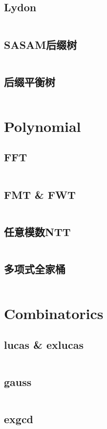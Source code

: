 \documentclass[titlepage, a4paper]{article}
\begin{document}
\begin{multicols}{2}
\begin{spacing}{0.6}
				\subsection{Lydon}
					\inputminted{cpp}{src/String/LydonWordDecomposition.cpp}
				\subsection{SASAM后缀树}
					\inputminted{cpp}{src/String/SASAM后缀树.cpp}
				\subsection{后缀平衡树}
					\inputminted{cpp}{src/String/后缀平衡树.cpp}
			\section{Polynomial}
				\subsection{FFT}
					\inputminted{cpp}{src/Math Polynomial/FFT.cpp}
				\subsection{FMT \& FWT}
					\inputminted{cpp}{src/Math Polynomial/FWT.cpp}
				\subsection{任意模数NTT}
					\inputminted{cpp}{src/Math Polynomial/任意模数多项式乘法.cpp}
				\subsection{多项式全家桶}
					\inputminted{cpp}{src/Math Polynomial/poly.cpp}
			\section{Combinatorics}
				\subsection{lucas \& exlucas}
					\inputminted{cpp}{src/Math Combinatorics/exlucas.cpp}
				\subsection{gauss}
					\inputminted{cpp}{src/Math Combinatorics/gauss.cpp}
				\subsection{exgcd}
					\inputminted{cpp}{src/Math Combinatorics/exgcd.cpp}

\end{spacing}
\end{multicols}
\end{document}
